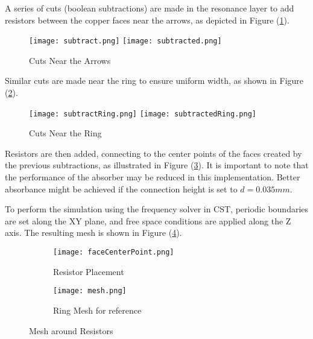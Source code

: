         A series of cuts (boolean subtractions) are made in the resonance layer
        to add resistors between the copper faces near the arrows, as depicted 
        in Figure (\ref{img:arrowCuts}).
        \begin{figure}[h]
            \centering
            \texttt{[image: subtract.png]}\hfil
            \texttt{[image: subtracted.png]}
            \caption{Cuts Near the Arrows}
            \label{img:arrowCuts}
        \end{figure}

        Similar cuts are made near the ring to ensure uniform width, as shown 
        in Figure (\ref{img:ringCuts}).
        \begin{figure}[h]
            \centering
            \texttt{[image: subtractRing.png]}\hfil
            \texttt{[image: subtractedRing.png]}
            \caption{Cuts Near the Ring}
            \label{img:ringCuts}
        \end{figure}

        Resistors are then added, connecting to the center points of the faces
        created by the previous subtractions, as illustrated in Figure 
        (\ref{img:resistors}). It is important to note that the performance of 
        the absorber may be reduced in this implementation. Better absorbance 
        might be achieved if the connection height is set to $d=0.035mm$.

        To perform the simulation using the frequency solver in CST, periodic 
        boundaries are set along the XY plane, and free space conditions are 
        applied along the Z axis. The resulting mesh is shown in Figure 
        (\ref{img:RingAndArrowMesh}).
        
        \begin{figure}
            \centering
            \begin{subfigure}{0.49\textwidth}
                \centering
                \texttt{[image: faceCenterPoint.png]}
                \caption{Resistor Placement}
                \label{img:resistors}
            \end{subfigure}
            \hfill
            \begin{subfigure}{0.49\textwidth}
                \centering
                \texttt{[image: mesh.png]}
                \caption{Ring Mesh for reference}
                \label{img:RingAndArrowMesh}
            \end{subfigure}
            \caption{Mesh around Resistors}
            \label{fig:combined}
        \end{figure}

